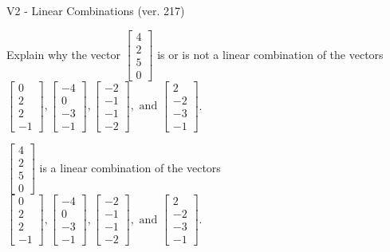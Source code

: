 \begin{exercise}
  \begin{exerciseTitle}V2 - Linear Combinations (ver. 217)\end{exerciseTitle}
  \begin{exerciseStatement}
    Explain why the vector \(\left[\begin{array}{c}
4 \\
2 \\
5 \\
0
\end{array}\right]\)  is or is not a linear 
	combination of the vectors \(\left[\begin{array}{c}
0 \\
2 \\
2 \\
-1
\end{array}\right] , \left[\begin{array}{c}
-4 \\
0 \\
-3 \\
-1
\end{array}\right] , \left[\begin{array}{c}
-2 \\
-1 \\
-1 \\
-2
\end{array}\right] , \text{ and } \left[\begin{array}{c}
2 \\
-2 \\
-3 \\
-1
\end{array}\right]\).
	


  \end{exerciseStatement}
  \begin{exerciseAnswer}
   \(\left[\begin{array}{c}
4 \\
2 \\
5 \\
0
\end{array}\right]\) 
  	 is  
	a linear combination of the vectors \(\left[\begin{array}{c}
0 \\
2 \\
2 \\
-1
\end{array}\right] , \left[\begin{array}{c}
-4 \\
0 \\
-3 \\
-1
\end{array}\right] , \left[\begin{array}{c}
-2 \\
-1 \\
-1 \\
-2
\end{array}\right] , \text{ and } \left[\begin{array}{c}
2 \\
-2 \\
-3 \\
-1
\end{array}\right]\).


\end{exerciseAnswer}
\end{exercise}
